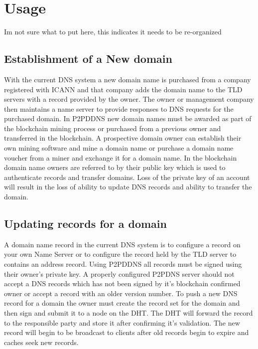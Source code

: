\documentclass[11pt]{ieeetran} %
\begin{document}
\section{Usage}
Im not sure what to put here, this indicates it needs to be re-organized
\subsection{Establishment of a New domain}
With the current DNS system a new domain name is purchased from a company registered with ICANN and that company adds the domain name to the TLD servers with a record provided by the owner. The owner or management company then maintains a name server to provide responses to DNS requests for the purchased domain. In P2PDDNS new domain names must be awarded as part of the blockchain mining process or purchased from a previous owner and transferred in the blockchain. A prospective domain owner can establish their own mining software and mine a domain name or purchase a domain name voucher from a miner and exchange it for a domain name. In the blockchain domain name owners are referred to by their public key which is used to authenticate records and transfer domains. Loss of the private key of an account will result in the loss of ability to update DNS records and ability to transfer the domain. 

\subsection{Updating records for a domain}
A domain name record in the current DNS system is to configure a record on your own Name Server or to configure the record held by the TLD server to contains an address record. Using P2PDDNS all records must be signed using their owner’s private key. A properly configured P2PDNS server should not accept a DNS records which has not been signed by it’s blockchain confirmed owner or accept a record with an older version number. To push a new DNS record for a domain the owner must create the record set for the domain and then sign and submit it to a node on the DHT. The DHT will forward the record to the responsible party and store it after confirming it’s validation. The new record will begin to be broadcast to clients after old records begin to expire and caches seek new records.
\end{document}
